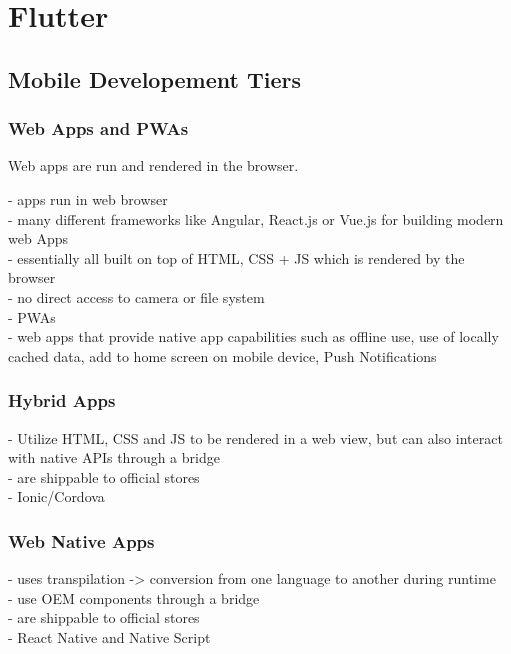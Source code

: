 \chapter{Flutter}

\section{Mobile Developement Tiers} \label{section::other_architectures}
\subsection{Web Apps and PWAs}
Web apps are run and rendered in the browser. 

- apps run in web browser\\
- many different frameworks like Angular, React.js or Vue.js for building modern web Apps\\
- essentially all built on top of HTML, CSS + JS which is rendered by the browser\\
- no direct access to camera or file system\\
- PWAs\\
    - web apps that provide native app capabilities such as offline use, use of locally cached data, add to home screen on mobile device, 
    Push Notifications\\

\subsection{Hybrid Apps}
- Utilize HTML, CSS and JS to be rendered in a web view, but can also interact with native APIs through a bridge\\
- are shippable to official stores\\
- Ionic/Cordova\\

\subsection{Web Native Apps}
- uses transpilation -> conversion from one language to another during runtime\\
- use OEM components through a bridge\\
- are shippable to official stores\\
- React Native and Native Script\\

